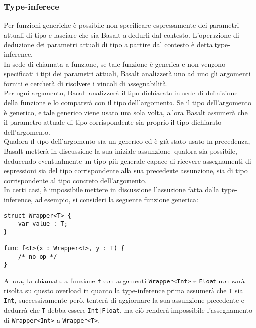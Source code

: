 \subsubsection{Type-inferece}
Per funzioni generiche è possibile non specificare espressamente dei parametri 
attuali di tipo e lasciare che sia Basalt a dedurli dal contesto. 
L’operazione di deduzione dei parametri attuali di tipo a partire dal 
contesto è detta type-inference. \\

In sede di chiamata a funzione, se tale funzione è generica e non vengono specificati
i tipi dei parametri attuali, Basalt analizzerà uno ad uno gli argomenti forniti e cercherà 
di risolvere i vincoli di assegnabilità. \\

Per ogni argomento, Basalt analizzerà il tipo dichiarato in sede di definizione della funzione e 
lo comparerà con il tipo dell'argomento. Se il tipo dell'argomento è generico, e tale generico 
viene usato una sola volta, allora Basalt assumerà che il parametro attuale di tipo corrispondente sia 
proprio il tipo dichiarato dell'argomento. \\

Qualora il tipo dell'argomento sia un generico ed è già stato usato in precedenza, Basalt metterà in discussione
la sua iniziale assunzione, qualora sia possibile, deducendo eventualmente un tipo più generale capace di ricevere assegnamenti di 
espressioni sia del tipo corrispondente alla sua precedente assunzione, sia di tipo corrispondente al tipo concreto 
dell'argomento. \\

In certi casi, è impossibile mettere in discussione l'assuzione fatta dalla type-inference, ad esempio, si consideri 
la seguente funzione generica:

\vspace{0.5cm}
\begin{lstlisting}[frame=single]
struct Wrapper<T> {
    var value : T;
}

func f<T>(x : Wrapper<T>, y : T) { 
    /* no-op */ 
}
\end{lstlisting}
\vspace{0.5cm}

Allora, la chiamata a funzione \texttt{f} con argomenti \texttt{Wrapper<Int>} e \texttt{Float} non sarà 
risolta su questo overload in quanto la type-inference prima assumerà che \texttt{T} sia \texttt{Int}, successivamente 
però, tenterà di aggiornare la sua assunzione precedente e dedurrà che \texttt{T} debba essere \texttt{Int|Float},
ma ciò renderà impossibile l'assegnamento di \texttt{Wrapper<Int>} a \texttt{Wrapper<T>}. \\

